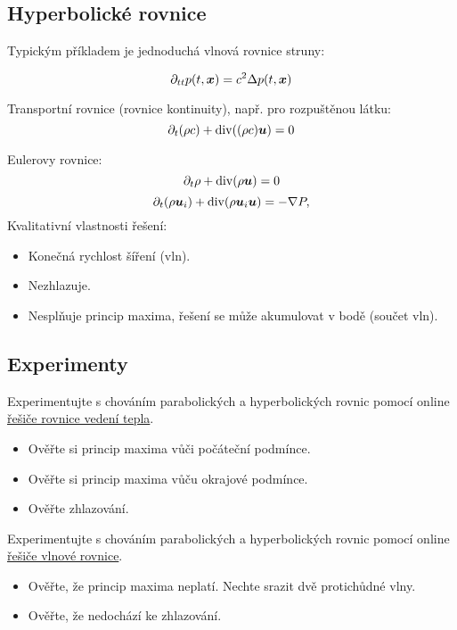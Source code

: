 \subsection{Hyperbolické rovnice}
Typickým příkladem je jednoduchá vlnová rovnice struny:

\[
    \partial_{tt} p(t, \mathbf{\boldsymbol{x}}) = c^2 \Delta p(t, \mathbf{\boldsymbol{x}})
\]

Transportní rovnice (rovnice kontinuity), např. pro rozpuštěnou látku:
\[
    \partial_t (\rho c) + \operatorname{div}( (\rho c) \mathbf{\boldsymbol{u}})=0
\]

Eulerovy rovnice:
\[
    \partial_t \rho + \operatorname{div}( \rho \mathbf{\boldsymbol{u}})=0
\]
\[
    \partial_t (\rho \mathbf{\boldsymbol{u}}_i) +\operatorname{div}(\rho \mathbf{\boldsymbol{u}}_i \mathbf{\boldsymbol{u}}) = - \nabla P,
\]
Kvalitativní vlastnosti řešení:
\begin{itemize}
 \item Konečná rychlost šíření (vln).
 \item Nezhlazuje.  
 \item Nesplňuje princip maxima, řešení se může akumulovat v bodě 
 (součet vln).
\end{itemize}




\subsection{Experimenty}
Experimentujte s chováním parabolických a hyperbolických rovnic pomocí 
online \href{http://math.uchicago.edu/~luis/pde/heat.html}{řešiče rovnice vedení tepla}.
\begin{itemize}
 \item Ověřte si princip maxima vůči počáteční podmínce.
 \item Ověřte si princip maxima vůču okrajové podmínce.
 \item Ověřte zhlazování.
\end{itemize}

Experimentujte s chováním parabolických a hyperbolických rovnic pomocí 
online \href{http://math.uchicago.edu/~luis/pde/wave.html}{řešiče vlnové rovnice}.
\begin{itemize}
 \item Ověřte, že princip maxima neplatí. Nechte srazit dvě protichůdné vlny.
 \item Ověřte, že nedochází ke zhlazování.
\end{itemize}






